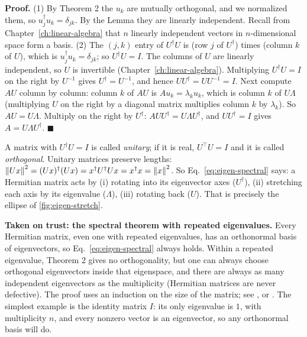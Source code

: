 \textbf{Proof.} (1) By Theorem 2 the $u_k$ are mutually orthogonal, and we normalized them, so $u_j^\dagger u_k=\delta_{jk}$. By the Lemma they are linearly independent. Recall from Chapter~\ref{ch:linear-algebra} that $n$ linearly independent vectors in $n$-dimensional space form a basis. (2) The $(j,k)$ entry of $U^\dagger U$ is (row $j$ of $U^\dagger$) times (column $k$ of $U$), which is $u_j^\dagger u_k=\delta_{jk}$; so $U^\dagger U=I$. The columns of $U$ are linearly independent, so $U$ is invertible (Chapter~\ref{ch:linear-algebra}). Multiplying $U^\dagger U=I$ on the right by $U^{-1}$ gives $U^\dagger=U^{-1}$, and hence $UU^\dagger=UU^{-1}=I$. Next compute $AU$ column by column: column $k$ of $AU$ is $Au_k=\lambda_ku_k$, which is column $k$ of $U\Lambda$ (multiplying $U$ on the right by a diagonal matrix multiplies column $k$ by $\lambda_k$). So $AU=U\Lambda$. Multiply on the right by $U^\dagger$: $AUU^\dagger=U\Lambda U^\dagger$, and $UU^\dagger=I$ gives $A=U\Lambda U^\dagger$. $\blacksquare$

A matrix with $U^\dagger U=I$ is called \emph{unitary}; if it is real, $U^\top U=I$ and it is called \emph{orthogonal}. Unitary matrices preserve lengths: $\left\lVert Ux\right\rVert^2=(Ux)^\dagger(Ux)=x^\dagger U^\dagger Ux=x^\dagger x=\left\lVert x\right\rVert^2$. So Eq.~\eqref{eq:eigen-spectral} says: a Hermitian matrix acts by (i) rotating into its eigenvector axes ($U^\dagger$), (ii) stretching each axis by its eigenvalue ($\Lambda$), (iii) rotating back ($U$). That is precisely the ellipse of \cref{fig:eigen-stretch}.

\begin{beyond}
\textbf{Taken on trust: the spectral theorem with repeated eigenvalues.} Every Hermitian matrix, even one with repeated eigenvalues, has an orthonormal basis of eigenvectors, so Eq.~\eqref{eq:eigen-spectral} always holds. Within a repeated eigenvalue, Theorem 2 gives no orthogonality, but one can always choose orthogonal eigenvectors inside that eigenspace, and there are always as many independent eigenvectors as the multiplicity (Hermitian matrices are never defective). The proof uses an induction on the size of the matrix; see \cite{strang}, \cite{trefethen} or \cite{rhb}. The simplest example is the identity matrix $I$: its only eigenvalue is $1$, with multiplicity $n$, and every nonzero vector is an eigenvector, so any orthonormal basis will do.
\end{beyond}

